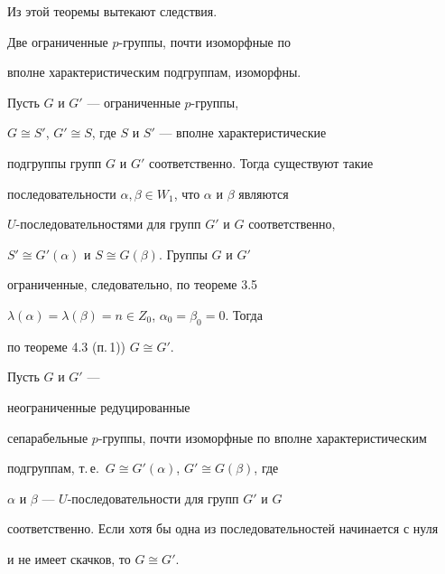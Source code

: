 Из этой теоремы вытекают следствия.





\begin{cors}


Две ограниченные $p$-группы, почти изоморфные по


вполне характеристическим подгруппам, изоморфны.


\end{cors}





\begin{pf}


Пусть $G$ и $G'$ --- ограниченные $p$-группы,


$G\cong S'$, $G'\cong S$, где $S$ и $S'$ --- вполне характеристические


подгруппы групп $G$ и $G'$ соответственно. Тогда существуют такие


последовательности $\alpha,\beta\in W_1$, что $\alpha$ и $\beta$ являются


$U$-последовательностями для групп $G'$ и $G$ соответственно,


$S'\cong G'(\alpha)$ и $S\cong G(\beta)$. Группы $G$ и $G'$


ограниченные, следовательно, по теореме 3.5


$\lambda(\alpha)=\lambda(\beta)=n\in Z_0$, $\alpha_0=\beta_0=0$. Тогда


по теореме 4.3 (п.\,1)) $G\cong G'$.


\end{pf}





\begin{cors}


Пусть $G$ и $G'$ ---


неограниченные редуцированные


сепарабельные $p$-группы, почти изоморфные по вполне характеристическим


подгруппам, т.\,е.\ $G\cong G'(\alpha)$, $G'\cong G(\beta)$, где


$\alpha$ и $\beta$ --- $U$-последовательности для групп $G'$ и $G$


соответственно. Если хотя бы одна из последовательностей начинается с нуля


и не имеет скачков, то $G\cong G'$.


\end{cors}





